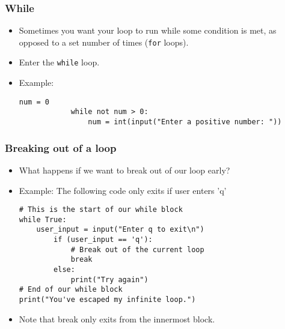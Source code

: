 \documentclass[notes]{beamer}
\begin{document}
	\begin{frame}[fragile]
		\frametitle{While}
		\begin{itemize}
			\item Sometimes you want your loop to run while some condition is met, as opposed to a set number of times (\lstinline|for| loops).
			\item Enter the \lstinline|while| loop.
			\pause
			\item Example:
			\begin{lstlisting}[xleftmargin=\dimexpr-\leftmargini, basicstyle=\scriptsize\tt]
			num = 0
			while not num > 0:
			    num = int(input("Enter a positive number: "))
			\end{lstlisting}

		\end{itemize}
	\end{frame}
	
	\begin{frame}[fragile]
		\frametitle{Breaking out of a loop}
		\begin{itemize}
			\item What happens if we want to break out of our loop early?
			\item Example:
			The following code only exits if user enters 'q'
			\begin{lstlisting}[xleftmargin=\dimexpr-\leftmargini, basicstyle=\scriptsize\tt]
# This is the start of our while block
while True:
    user_input = input("Enter q to exit\n")
        if (user_input == 'q'):
            # Break out of the current loop
            break
        else:
            print("Try again")
# End of our while block
print("You've escaped my infinite loop.")
			\end{lstlisting}
			\pause
			\item Note that break only exits from the innermost block.

		\end{itemize}
	\end{frame}
	
\end{document}
